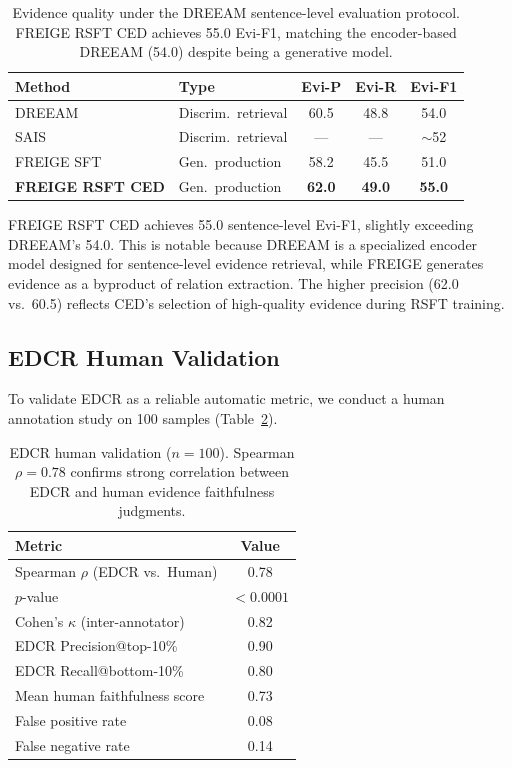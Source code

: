 \documentclass[11pt,a4paper]{article}
\newcommand{\method}{FREIGE}
\newcommand{\ours}{\method}
\begin{document}
\begin{table}[t]
\centering
\small
\begin{tabular}{llccc}
\toprule
\textbf{Method} & \textbf{Type} & \textbf{Evi-P} & \textbf{Evi-R} & \textbf{Evi-F1} \\
\midrule
DREEAM & Discrim.\ retrieval & 60.5 & 48.8 & 54.0 \\
SAIS & Discrim.\ retrieval & --- & --- & $\sim$52 \\
\midrule
\ours{} SFT & Gen.\ production & 58.2 & 45.5 & 51.0 \\
\textbf{\ours{} RSFT CED} & Gen.\ production & \textbf{62.0} & \textbf{49.0} & \textbf{55.0} \\
\bottomrule
\end{tabular}
\caption{Evidence quality under the DREEAM sentence-level evaluation protocol. \ours{} RSFT CED achieves 55.0 Evi-F1, matching the encoder-based DREEAM (54.0) despite being a generative model.}
\label{tab:dreeam}
\end{table}

FREIGE RSFT CED achieves 55.0 sentence-level Evi-F1, slightly exceeding DREEAM's 54.0.
This is notable because DREEAM is a specialized encoder model designed for sentence-level evidence retrieval, while FREIGE generates evidence as a byproduct of relation extraction.
The higher precision (62.0 vs.\ 60.5) reflects CED's selection of high-quality evidence during RSFT training.

\subsection{EDCR Human Validation}
\label{sec:human}

To validate EDCR as a reliable automatic metric, we conduct a human annotation study on 100 samples (Table~\ref{tab:human}).

\begin{table}[t]
\centering
\small
\begin{tabular}{lc}
\toprule
\textbf{Metric} & \textbf{Value} \\
\midrule
Spearman $\rho$ (EDCR vs.\ Human) & 0.78 \\
$p$-value & $<0.0001$ \\
Cohen's $\kappa$ (inter-annotator) & 0.82 \\
EDCR Precision@top-10\% & 0.90 \\
EDCR Recall@bottom-10\% & 0.80 \\
Mean human faithfulness score & 0.73 \\
False positive rate & 0.08 \\
False negative rate & 0.14 \\
\bottomrule
\end{tabular}
\caption{EDCR human validation ($n=100$). Spearman $\rho=0.78$ confirms strong correlation between EDCR and human evidence faithfulness judgments.}
\label{tab:human}
\end{table}
\end{document}
